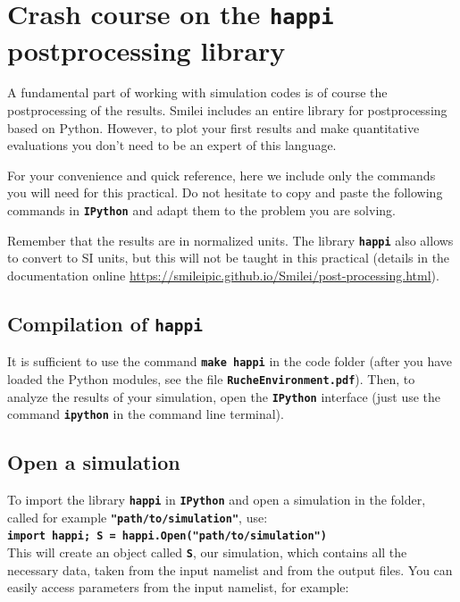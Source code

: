 \documentclass{article}
\newcommand{\smilei}{{\sc Smilei}\xspace}
\newcommand{\commandline}[1]{\texttt{\textbf{#1}}}
\begin{document}
\section{Crash course on the \commandline{happi} postprocessing library}\label{happi}
A fundamental part of working with simulation codes is of course the postprocessing of the results. \smilei includes an entire library for postprocessing based on Python. However, to  plot your first results and make quantitative evaluations you don't need to be an expert of this language.

For your convenience and quick reference, here we include only the commands you will need for this practical. Do not hesitate to copy and paste the following commands in \commandline{IPython} and adapt them to the problem you are solving.

Remember that the results are in normalized units. The library \commandline{happi} also allows to convert to SI units, but this will not be taught in this practical (details in the documentation online \url{https://smileipic.github.io/Smilei/post-processing.html}).

\subsection*{Compilation of \commandline{happi}}
It is sufficient to use the command \commandline{make happi} in the code folder (after you have loaded the Python modules, see the file \commandline{RucheEnvironment.pdf}). Then, to analyze the results of your simulation, open the \commandline{IPython} interface (just use the command \commandline{ipython} in the command line terminal). 

\subsection*{Open a simulation}
To import the library \commandline{happi} in \commandline{IPython} and open a simulation in the folder,  called for example \commandline{"path/to/simulation"}, use:\\

\commandline{import happi; S =  happi.Open("path/to/simulation")}\\

This will create an object called \commandline{S}, our simulation, which contains all the necessary data, taken from the input namelist and from the output files. You can easily access parameters from the input namelist, for  example:\\
\end{document}
